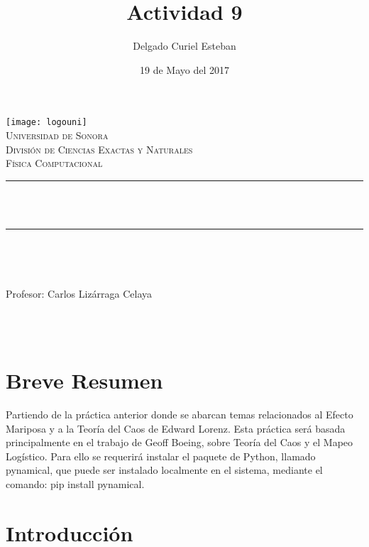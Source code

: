 \documentclass[12pt]{article}
\title{Actividad 9}	%
\author{\centering Delgado Curiel Esteban}											%
\date{19 de Mayo del 2017} %
\makeatletter
\let\thetitle\@title
\let\theauthor\@author
\let\thedate\@date
\makeatother
\begin{document}

\begin{titlepage}
	\begin{centering}
    
    \vspace*{0.5 cm}
    \texttt{[image: logouni]}\\[0.5 cm]	%
    \textsc{\Large Universidad de Sonora}\\[1.0 cm]	%
	\textsc{\Large División de Ciencias Exactas y Naturales}\\[0.5 cm]				%
	\textsc{\large Física Computacional}\\[0.5 cm]				%
	\rule{\linewidth}{0.2 mm} \\[0.4 cm]
	{ \huge \bfseries \thetitle}\\
	\rule{\linewidth}{0.2 mm} \\[0.5 cm]
	
	\begin{minipage}{\textwidth}
		\begin{flushleft} 
			\emph{\Large} \large \\
			\theauthor
			\end{flushleft}
	
		\begin{flushleft} 
			{Profesor:} \large \centering Carlos Lizárraga Celaya	
			\end{flushleft}
	\end{minipage}\\[1 cm]
	{\large \thedate}\\[2 cm]
 
	\vfill
    \end{centering}
    \end{titlepage}
    
\section*{Breve Resumen}
Partiendo de la práctica anterior donde se abarcan temas relacionados al Efecto Mariposa y a la Teoría del Caos de Edward Lorenz. Esta práctica será basada principalmente en el trabajo de Geoff Boeing, sobre Teoría del Caos y el Mapeo Logístico.  Para ello se requerirá instalar el paquete de Python, llamado pynamical, que puede ser instalado localmente en el sistema, mediante el comando: pip install pynamical.


\section*{Introducción}
\end{document}
